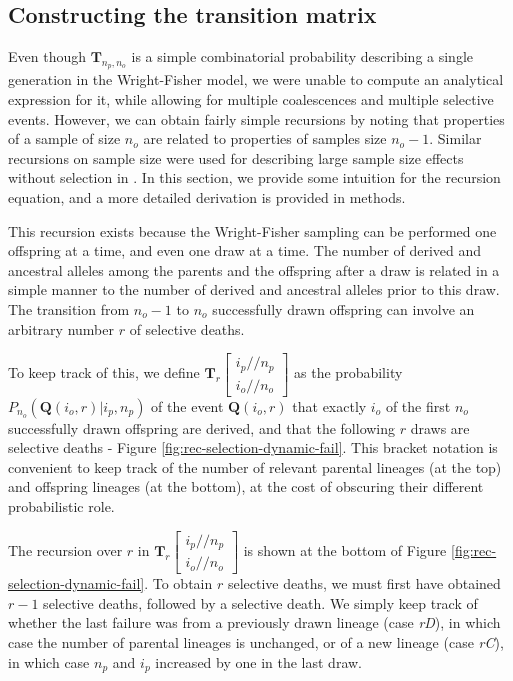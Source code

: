 \documentclass[review]{elsarticle}
\newcommand{\dslash}{/\!\!/}
\newcommand{\Coalc}[4]{\begin{bmatrix}#1\dslash #2 \\ #3\dslash #4 \end{bmatrix}}
\begin{document}
\subsection{Constructing the transition matrix}
\label{subsec:trans-mat}

Even though $\mathbf{T}_{n_p,n_o}$ is a simple combinatorial probability describing a single
generation in the Wright-Fisher model, we were unable to compute an analytical expression for it,
while allowing for multiple coalescences and multiple selective events. However, we can obtain
fairly simple recursions by noting that properties of a sample of size $n_o$ are related to
properties of samples size $n_o-1.$ Similar recursions on sample size were used for describing large
sample size effects without selection in \citep{BhaskarEtAl2014}. In this section, we provide some
intuition for the recursion equation, and a more detailed derivation is provided in methods.

This recursion exists because the Wright-Fisher sampling can be performed one offspring at a time,
and even one draw at a time. The number of derived and ancestral alleles among the parents and the
offspring after a draw is related in a simple manner to the number of derived and ancestral alleles
prior to this draw. The transition from $n_o-1$ to $n_o$ successfully drawn offspring can involve an
arbitrary number $r$ of selective deaths. 

To keep track of this, we define $\mathbf{T}_{r}\Coalc{i_p}{n_p}{i_o}{n_o}$ as the probability
$P_{n_o}(\mathbf{Q}(i_o,r) | i_p, n_p)$ of the event $\mathbf{Q}(i_o,r)$ that exactly $i_o$ of the
first $n_o$ successfully drawn offspring are derived, and that the following $r$ draws are selective
deaths - Figure \ref{fig:rec-selection-dynamic-fail}. This bracket notation is convenient to keep track of
the number of relevant parental lineages (at the top) and offspring lineages (at the bottom), at the
cost of obscuring their different probabilistic role.
  
The recursion over $r$ in $\mathbf{T}_{r}\Coalc{i_p}{n_p}{i_o}{n_o}$ is shown at the bottom of
Figure \ref{fig:rec-selection-dynamic-fail}. To obtain $r$ selective deaths, we must first have
obtained $r-1$ selective deaths, followed by a selective death. We simply keep track of whether the
last failure was from a previously drawn lineage (case \textit{rD}), in which case the number of
parental lineages is unchanged, or of a new lineage (case \textit{rC}), in which case $n_p$ and
$i_p$ increased by one in the last draw.
 
\end{document}
